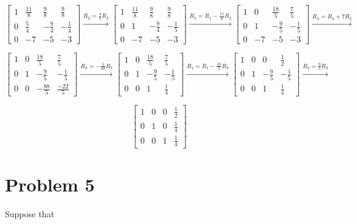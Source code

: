 \documentclass[letter,11pt]{article}
\begin{document}
\begin{tcolorbox}[boxrule=1mm, width=(.9\linewidth),before=\hfill,after=\hfill,adjusted title={Problem \# 4 Solutions}]
$$\begin{bmatrix}
1 & \frac{11}{8} & \frac{9}{8} & \frac{9}{8} \\
0 & \frac{5}{4} & -\frac{9}{4} & -\frac{1}{4}\\
0 & -7 & -5 & -3
\end{bmatrix} \xrightarrow{R_{2}=\frac{4}{5}R_2}
\begin{bmatrix}
1 & \frac{11}{8} & \frac{9}{8} & \frac{9}{8} \\
0 & 1 & -\frac{9}{4} & -\frac{1}{5}\\
0 & -7 & -5 & -3
\end{bmatrix}\xrightarrow{R_1=R_1-\frac{11}{8}R_2}
\begin{bmatrix}
1 & 0 & \frac{18}{5} & \frac{7}{5} \\
0 & 1 & -\frac{9}{5} & -\frac{1}{5}\\
0 & -7 & -5 & -3
\end{bmatrix}\xrightarrow{R_3=R_3+7R_2}$$

$$\begin{bmatrix}
1 & 0 & \frac{18}{5} & \frac{7}{5} \\
0 & 1 & -\frac{9}{5} & -\frac{1}{5}\\
0 & 0 & -\frac{88}{5} & \frac{-22}{5}
\end{bmatrix} \xrightarrow{R_3=-\frac{5}{88}R_3}
\begin{bmatrix}
1 & 0 & \frac{18}{5} & \frac{7}{5} \\
0 & 1 & -\frac{9}{5} & -\frac{1}{5}\\
0 & 0 & 1 & \frac{1}{4}
\end{bmatrix}\xrightarrow{R_1=R_1-\frac{18}{5}R_3}
\begin{bmatrix}
1 & 0 & 0 & \frac{1}{2} \\
0 & 1 & -\frac{9}{5} & -\frac{1}{5}\\
0 & 0 & 1 & \frac{1}{4}
\end{bmatrix}\xrightarrow{R_2 = \frac{9}{5}R_3}$$

$$\begin{bmatrix}
1 & 0 & 0 & \frac{1}{2} \\
0 & 1 & 0 & \frac{1}{4}\\
0 & 0 & 1 & \frac{1}{4}
\end{bmatrix}$$
\end{tcolorbox}
\newpage
\section{Problem 5}
Suppose that
\end{document}
